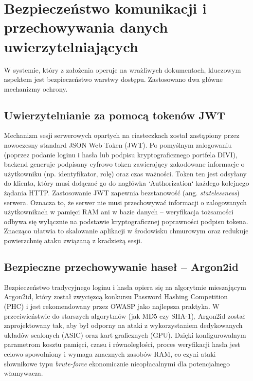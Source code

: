 \documentclass[12pt,a4paper,twoside]{report}
\begin{document}
\newpage
\section{Bezpieczeństwo komunikacji i przechowywania danych uwierzytelniających}

W systemie, który z założenia operuje na wrażliwych dokumentach, kluczowym aspektem jest bezpieczeństwo warstwy dostępu. Zastosowano dwa główne mechanizmy ochrony.

\subsection{Uwierzytelnianie za pomocą tokenów JWT}
Mechanizm sesji serwerowych opartych na ciasteczkach został zastąpiony przez nowoczesny standard JSON Web Token (JWT). Po pomyślnym zalogowaniu (poprzez podanie loginu i hasła lub podpisu kryptograficznego portfela DIVI), backend generuje podpisany cyfrowo token zawierający zakodowane informacje o użytkowniku (np. identyfikator, rolę) oraz czas ważności. Token ten jest odsyłany do klienta, który musi dołączać go do nagłówka `Authorization` każdego kolejnego żądania HTTP.
Zastosowanie JWT zapewnia bezstanowość (ang. \textit{statelessness}) serwera. Oznacza to, że serwer nie musi przechowywać informacji o zalogowanych użytkownikach w pamięci RAM ani w bazie danych -- weryfikacja tożsamości odbywa się wyłącznie na podstawie kryptograficznej poprawności podpisu tokena. Znacząco ułatwia to skalowanie aplikacji w środowisku chmurowym oraz redukuje powierzchnię ataku związaną z kradzieżą sesji.

\subsection{Bezpieczne przechowywanie haseł -- Argon2id}
Bezpieczeństwo tradycyjnego loginu i hasła opiera się na algorytmie mieszającym Argon2id, który został zwycięzcą konkursu Password Hashing Competition (PHC) i jest rekomendowany przez OWASP jako najlepsza praktyka. W przeciwieństwie do starszych algorytmów (jak MD5 czy SHA-1), Argon2id został zaprojektowany tak, aby był odporny na ataki z wykorzystaniem dedykowanych układów scalonych (ASIC) oraz kart graficznych (GPU). Dzięki konfigurowalnym parametrom kosztu pamięci, czasu i równoległości, proces weryfikacji hasła jest celowo spowolniony i wymaga znacznych zasobów RAM, co czyni ataki słownikowe typu \textit{brute-force} ekonomicznie nieopłacalnymi dla potencjalnego włamywacza.

\newpage
\end{document}
